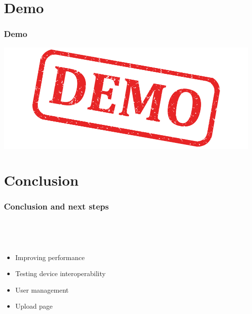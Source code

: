 \section{Demo}

\begin{frame}
  \frametitle{Demo}
  \includegraphics[width=\textwidth]{images/demo}
\end{frame}

\section{Conclusion}

\begin{frame}
  \frametitle{Conclusion and next steps}
  \begin{description}[]
    \item[Conclusion] \hfill \\
    \begin{block}{}
    \end{block}
    \item[Next Steps] \hfill \\
      \begin{itemize}
        \item Improving performance
        \item Testing device interoperability
        \item User management
        \item Upload page
      \end{itemize}
  \end{description} 
\end{frame}


